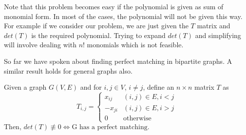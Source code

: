 Note that this problem becomes easy if the polynomial is given as sum of 
monomial form. In most of the cases, the polynomial will not be given this way.
For example if we consider our problem, we are just given the $T$ matrix and
$det(T)$ is the required polynomial. Trying to expand $det(T)$ and simplifying
will involve dealing with $n!$ monomials which is not feasible.

So far we have spoken about finding perfect matching in bipartite graphs. A
similar result holds for general graphs also. 
\begin{theorem}
Given a graph $G(V,E)$ and for $i, j \in V$, $i \ne j$, define an $n \times n$
matrix $T$ as
\[T_{i,j} = \begin{cases}
		x_{ij} & (i,j) \in E, i < j\\
	       -x_{ji} & (i,j) \in E, i > j\\
   	        0 & \text{otherwise}
	    \end{cases}
    \]
	    Then, $det(T) \not \equiv 0 \iff \text{G has a perfect matching}$.
\end{theorem}


